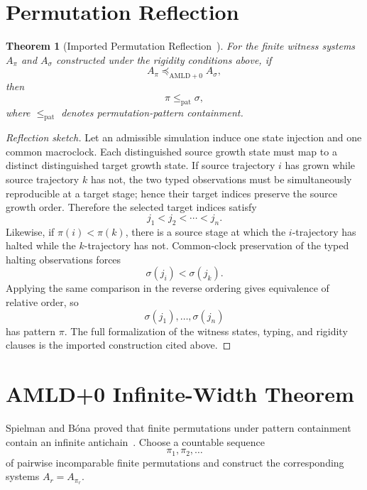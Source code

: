 \documentclass[11pt]{article}
\newtheorem{theorem}{Theorem}[section]
\theoremstyle{definition}
\begin{document}
\section{Permutation Reflection}

\begin{theorem}[Imported Permutation Reflection~\cite{tenneson-antichain}]
For the finite witness systems $A_\pi$ and $A_\sigma$ constructed under the rigidity conditions above, if
\[
A_\pi\preceq_{\mathrm{AMLD+0}}A_\sigma,
\]
then
\[
\pi\le_{\mathrm{pat}}\sigma,
\]
where $\le_{\mathrm{pat}}$ denotes permutation-pattern containment.
\end{theorem}

\begin{proof}[Reflection sketch]
Let an admissible simulation induce one state injection and one common macroclock. Each distinguished source growth state must map to a distinct distinguished target growth state. If source trajectory $i$ has grown while source trajectory $k$ has not, the two typed observations must be simultaneously reproducible at a target stage; hence their target indices preserve the source growth order. Therefore the selected target indices satisfy
\[
j_1<j_2<\cdots<j_n.
\]
Likewise, if $\pi(i)<\pi(k)$, there is a source stage at which the $i$-trajectory has halted while the $k$-trajectory has not. Common-clock preservation of the typed halting observations forces
\[
\sigma(j_i)<\sigma(j_k).
\]
Applying the same comparison in the reverse ordering gives equivalence of relative order, so
\[
\sigma(j_1),\ldots,\sigma(j_n)
\]
has pattern $\pi$. The full formalization of the witness states, typing, and rigidity clauses is the imported construction cited above.
\end{proof}

\section{AMLD+0 Infinite-Width Theorem}

Spielman and B\'ona proved that finite permutations under pattern containment contain an infinite antichain~\cite{spielmanbona}. Choose a countable sequence
\[
\pi_1,\pi_2,\ldots
\]
of pairwise incomparable finite permutations and construct the corresponding systems $A_r=A_{\pi_r}$.
\end{document}
